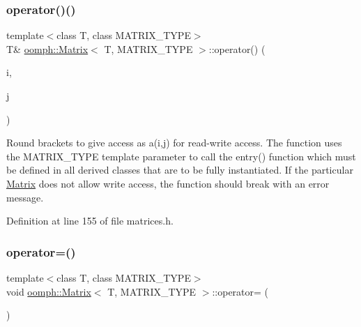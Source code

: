 \mbox{\label{classoomph_1_1Matrix_a1601b48479c8fe38dd2d04600d7ebbae}} 
\subsubsection{\texorpdfstring{operator()()}{operator()()}\hspace{0.1cm}{\footnotesize\ttfamily [2/2]}}
{\footnotesize\ttfamily template$<$class T, class M\+A\+T\+R\+I\+X\+\_\+\+T\+Y\+PE$>$ \\
T\& \hyperlink{classoomph_1_1Matrix}{oomph\+::\+Matrix}$<$ T, M\+A\+T\+R\+I\+X\+\_\+\+T\+Y\+PE $>$\+::operator() (\begin{DoxyParamCaption}\item[{const unsigned long \&}]{i,  }\item[{const unsigned long \&}]{j }\end{DoxyParamCaption})\hspace{0.3cm}{\ttfamily [inline]}}



Round brackets to give access as a(i,j) for read-\/write access. The function uses the M\+A\+T\+R\+I\+X\+\_\+\+T\+Y\+PE template parameter to call the entry() function which must be defined in all derived classes that are to be fully instantiated. If the particular \hyperlink{classoomph_1_1Matrix}{Matrix} does not allow write access, the function should break with an error message. 



Definition at line 155 of file matrices.\+h.

\mbox{\label{classoomph_1_1Matrix_a9220e1bb01e5c77c4d4c2e6cb6865277}} 
\subsubsection{\texorpdfstring{operator=()}{operator=()}}
{\footnotesize\ttfamily template$<$class T, class M\+A\+T\+R\+I\+X\+\_\+\+T\+Y\+PE$>$ \\
void \hyperlink{classoomph_1_1Matrix}{oomph\+::\+Matrix}$<$ T, M\+A\+T\+R\+I\+X\+\_\+\+T\+Y\+PE $>$\+::operator= (\begin{DoxyParamCaption}\item[{const \hyperlink{classoomph_1_1Matrix}{Matrix}$<$ T, M\+A\+T\+R\+I\+X\+\_\+\+T\+Y\+PE $>$ \&}]{ }\end{DoxyParamCaption})\hspace{0.3cm}{\ttfamily [inline]}}



